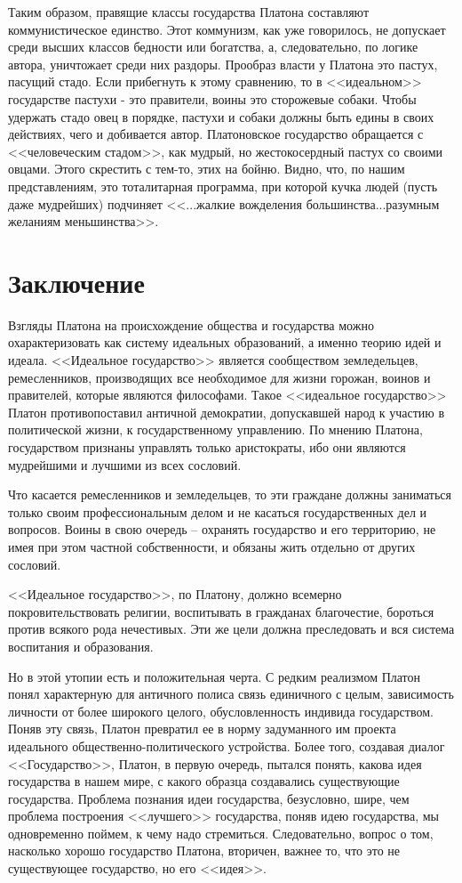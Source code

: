 	Таким образом, правящие классы государства Платона составляют 
	коммунистическое единство. Этот коммунизм, как уже говорилось, не 
	допускает среди высших классов бедности или богатства, а, следовательно, 
	по логике автора, уничтожает среди них раздоры. Прообраз власти у Платона 
	это пастух, пасущий стадо. Если прибегнуть к этому сравнению, то в 
	<<идеальном>> государстве пастухи - это правители, воины это сторожевые 
	собаки. Чтобы удержать стадо овец в порядке, пастухи и собаки должны быть 
	едины в своих действиях, чего и добивается автор. Платоновское государство 
	обращается с <<человеческим стадом>>, как мудрый, но жестокосердный пастух 
	со своими овцами. Этого скрестить с тем-то, этих на бойню. Видно, что, по 
	нашим представлениям, это тоталитарная программа, при которой кучка людей 
	(пусть даже мудрейших) подчиняет <<...жалкие вожделения большинства...разумным 
	желаниям меньшинства>>. 

\pagebreak
\chapter{Заключение}

	Взгляды Платона на происхождение общества и государства можно 
	охарактеризовать как систему идеальных образований, а именно теорию 
	идей и идеала. <<Идеальное государство>> является сообществом земледельцев, 
	ремесленников, производящих все необходимое для жизни горожан, воинов и 
	правителей, которые являются философами. Такое <<идеальное государство>> 
	Платон противопоставил античной демократии, допускавшей народ к участию 
	в политической жизни, к государственному управлению. По мнению Платона, 
	государством признаны управлять только аристократы, ибо они являются 
	мудрейшими и лучшими из всех сословий.

	Что касается ремесленников и земледельцев, то эти граждане должны 
	заниматься только своим профессиональным делом и не касаться 
	государственных дел и вопросов. Воины в свою очередь – охранять государство 
	и его территорию, не имея при этом частной собственности, и обязаны жить 
	отдельно от других сословий. 

	<<Идеальное государство>>, по Платону, должно всемерно покровительствовать 
	религии, воспитывать в гражданах благочестие, бороться против всякого рода 
	нечестивых. Эти же цели должна преследовать и вся система воспитания и 
	образования.

	Но в этой утопии есть и положительная черта. С редким реализмом Платон 
	понял характерную для античного полиса связь единичного с целым, 
	зависимость личности от более широкого целого, обусловленность индивида 
	государством. Поняв эту связь, Платон превратил ее в норму задуманного 
	им проекта идеального общественно-политического устройства. Более того, 
	создавая диалог <<Государство>>, Платон, в первую очередь, пытался понять, 
	какова идея государства в нашем мире, с какого образца создавались 
	существующие государства. Проблема познания идеи государства, безусловно, 
	шире, чем проблема построения <<лучшего>> государства, поняв идею 
	государства, мы одновременно поймем, к чему надо стремиться. 
	Следовательно, вопрос о том, насколько хорошо государство Платона, 
	вторичен, важнее то, что это не существующее государство, но его <<идея>>.

